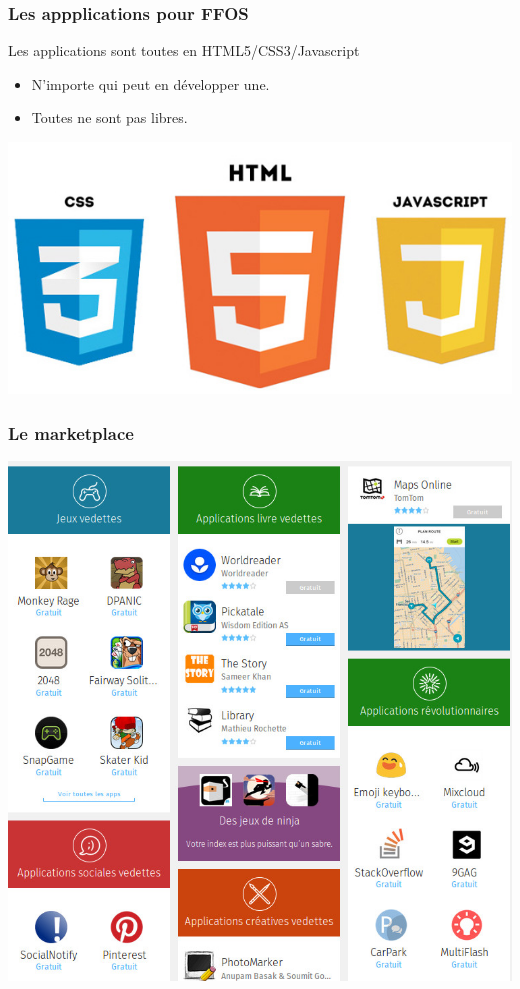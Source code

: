 \documentclass{beamer}
\begin{document}
\begin{frame}
\frametitle{Les appplications pour FFOS}
Les applications sont toutes en HTML5/CSS3/Javascript
\begin{itemize}
\item N'importe qui peut en développer une.
\item Toutes ne sont pas libres.
\end{itemize}

\begin{center}
\includegraphics[scale=0.3]{./images/logo-html5.jpg} 
\end{center}
\end{frame}

\begin{frame}
\frametitle{Le marketplace}
\begin{center}
\includegraphics[scale=0.3]{./images/marketplace01.jpg}
\end{center}
\end{frame}
\end{document}

